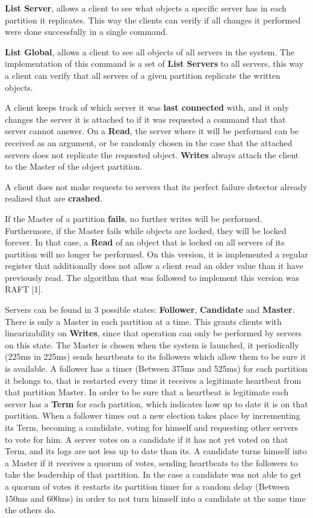 \documentclass[times, 10pt,twocolumn]{article}
\begin{document}
\textbf{List Server}, allows a client to see what objects a specific server has in each partition it replicates. This way the clients can verify if all changes it performed were done successfully in a single command.

\textbf{List Global}, allows a client to see all objects of all servers in the system. The implementation of this command is a set of \textbf{List Servers} to all servers, this way a client can verify that all servers of a given partition replicate the written objects.

A client keeps track of which server it was \textbf{last connected} with, and it only changes the server it is attached to if it was requested a command that that server cannot answer. On a \textbf{Read}, the server where it will be performed can be received as an argument, or be randomly chosen in the case that the attached servers does not replicate the requested object. \textbf{Writes} always attach the client to the Master of the object partition.

A client does not make requests to servers that its perfect failure detector already realized that are \textbf{crashed}.

If the Master of a partition \textbf{fails}, no further writes will be performed. Furthermore, if the Master fails while objects are locked, they will be locked forever. In that case, a \textbf{Read} of an object that is locked on all servers of its partition will no longer be performed.
On this version, it is implemented a regular register that additionally does not allow a client read an older value than it have previously read. The algorithm that was followed to implement this version was RAFT [1].

Servers can be found in 3 possible states: \textbf{Follower}, \textbf{Candidate} and \textbf{Master}. There is only a Master in each partition at a time. This grants clients with linearizability on \textbf{Writes}, since that operation can only be performed by servers on this state. The Master is chosen when the system is launched, it periodically (225ms in 225ms) sends heartbeats to its followers which allow them to be sure it is available. A follower has a timer (Between 375ms and 525ms) for each partition it belongs to, that is restarted every time it receives a legitimate heartbeat from that partition Master. In order to be sure that a heartbeat is legitimate each server has a \textbf{Term} for each partition, which indicates how up to date it is on that partition. When a follower times out a new election takes place by incrementing its Term, becoming a candidate, voting for himself and requesting other servers to vote for him. A server votes on a candidate if it has not yet voted on that Term, and its logs are not less up to date than its. A candidate turns himself into a Master if it receives a quorum of votes, sending heartbeats to the followers to take the leadership of that partition. In the case a candidate was not able to get a quorum of votes it restarts its partition timer for a random delay (Between 150ms and 600ms) in order to not turn himself into a candidate at the same time the others do. 
\end{document}
